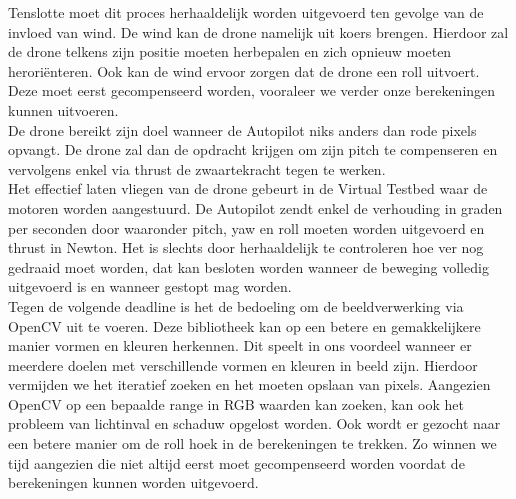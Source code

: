 Tenslotte moet dit proces herhaaldelijk worden uitgevoerd ten gevolge van de invloed van wind. De wind kan de drone namelijk uit koers brengen. Hierdoor zal de drone telkens zijn positie moeten herbepalen en zich opnieuw moeten herori\"enteren. Ook kan de wind ervoor zorgen dat de drone een roll uitvoert. Deze moet eerst gecompenseerd worden, vooraleer we verder onze berekeningen kunnen uitvoeren.\\

De drone bereikt zijn doel wanneer de Autopilot niks anders dan rode pixels opvangt. De drone zal dan de opdracht krijgen om zijn pitch te compenseren en vervolgens enkel via thrust de zwaartekracht tegen te werken. \\

Het effectief laten vliegen van de drone gebeurt in de Virtual Testbed waar de motoren worden aangestuurd. De Autopilot zendt enkel de verhouding in graden per seconden door waaronder pitch, yaw en roll moeten worden uitgevoerd en thrust in Newton. Het is slechts door herhaaldelijk te controleren hoe ver nog gedraaid moet worden, dat kan besloten worden wanneer de beweging volledig uitgevoerd is en wanneer gestopt mag worden.\\

Tegen de volgende deadline is het de bedoeling om de beeldverwerking via OpenCV uit te voeren. Deze bibliotheek kan op een betere en gemakkelijkere manier vormen en kleuren herkennen. Dit speelt in ons voordeel wanneer er meerdere doelen met verschillende vormen en kleuren in beeld zijn. Hierdoor vermijden we het iteratief zoeken en het moeten opslaan van pixels. Aangezien OpenCV op een bepaalde range in RGB waarden kan zoeken, kan ook het probleem van lichtinval en schaduw opgelost worden.
Ook wordt er gezocht naar een betere manier om de roll hoek in de berekeningen te trekken. Zo winnen we tijd aangezien die niet altijd eerst moet gecompenseerd worden voordat de berekeningen kunnen worden uitgevoerd. 